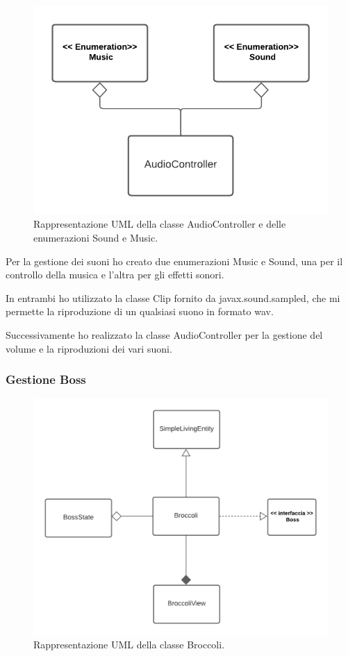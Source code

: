 \documentclass[a4paper,12pt]{report}
\begin{document}
\begin{figure}[H]
\centering{}
\includegraphics[scale=1] {img/audio.png}
\caption{Rappresentazione UML della classe AudioController e delle enumerazioni Sound e Music.}
\label{img:audio}
\end{figure}

Per la gestione dei suoni ho creato due enumerazioni Music e Sound, una per il controllo della musica e l'altra  per gli effetti sonori. 

In entrambi ho utilizzato la classe Clip fornito da javax.sound.sampled, che mi permette la riproduzione di un qualsiasi suono in formato wav.

Successivamente ho realizzato la classe AudioController per la gestione del volume e la  riproduzioni dei vari suoni.

\subsubsection{Gestione Boss}

\begin{figure}[H]
\centering{}
\includegraphics[scale=1] {img/boss.png}
\caption{Rappresentazione UML della classe Broccoli.}
\label{img:boss}
\end{figure}
\end{document}
